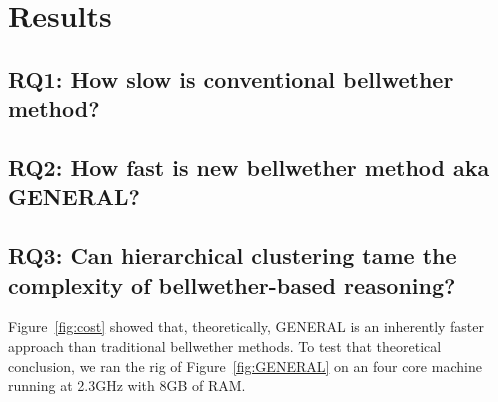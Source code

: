 \documentclass[10pt,journal,compsoc]{IEEEtran}
\newcommand{\fig}[1]{Figure~\ref{fig:#1}}
\begin{document}
\section{Results}
\label{sec:results}

\subsection*{RQ1: How slow is conventional bellwether method? }
\label{sec:rq3}

\subsection*{RQ2: How  fast  is  new  bellwether  method  aka  GENERAL?}
\label{sec:rq3}


\subsection*{RQ3: Can hierarchical clustering tame the complexity of bellwether-based reasoning?}
\label{sec:rq3}


 
\fig{cost} showed that, theoretically,
GENERAL is an inherently faster approach than traditional bellwether methods.
To test that theoretical
conclusion,
we ran the rig of \fig{GENERAL} on
an four core machine running at 2.3GHz with 8GB of RAM. 
\end{document}

